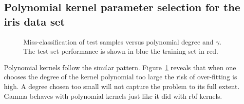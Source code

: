 \subsection{Polynomial kernel parameter selection for the iris data set}
\begin{figure}
\centering


\caption{Miss-classification of test samples versus polynomial degree and $\gamma$. The test set performance is shown in blue the training set in red.}
\label{fig:ployDegGamma}
\end{figure}
Polynomial kernels follow the similar pattern. Figure~\ref*{fig:ployDegGamma} reveals that when one chooses the degree of the kernel polynomial too large the risk of over-fitting is high. A degree chosen too small will not capture the problem to its full extent. Gamma behaves with polynomial kernels just like it did with rbf-kernels.  

